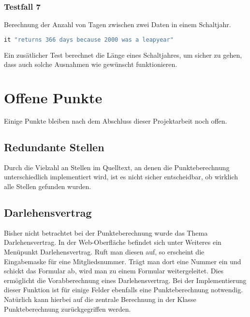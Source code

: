 \documentclass[12pt]{scrreprt}
\begin{document}
\subsubsection{Testfall 7}
Berechnung der Anzahl von Tagen zwischen zwei Daten in einem Schaltjahr.
\begin{lstlisting}[language=Ruby]
it "returns 366 days because 2000 was a leapyear"
\end{lstlisting}
Ein zusätlicher Test berechnet die Länge eines Schaltjahres, um sicher zu gehen, dass auch solche Ausnahmen wie gewünscht funktionieren.

\section{Offene Punkte}
Einige Punkte bleiben nach dem Abschluss dieser Projektarbeit noch offen. 

\subsection{Redundante Stellen}
Durch die Vielzahl an Stellen im Quelltext, an denen die Punkteberechnung unterschiedlich implementiert wird, ist es nicht sicher entscheidbar, ob wirklich alle Stellen gefunden wurden. 

\subsection{Darlehensvertrag} 
Bisher nicht betrachtet bei der Punkteberechnung wurde das Thema Darlehensvertrag. In der Web-Oberfläche befindet sich unter Weiteres ein Menüpunkt Darlehensvertrag. Ruft man diesen auf, so erscheint die Eingabemaske für eine Mitgliedsnummer. Trägt man dort eine Nummer ein und schickt das Formular ab, wird man zu einem Formular weitergeleitet. Dies ermöglicht die Vorabberechnung eines Darlehensvertrag. Bei der Implementierung dieser Funktion ist für einige Felder ebenfalls eine Punkteberechnung notwendig. Natürlich kann hierbei auf die zentrale Berechnung in der Klasse Punkteberechnung zurückgegriffen werden.
\end{document}
